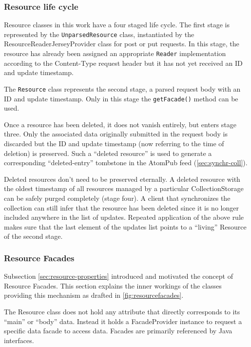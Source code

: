 \documentclass[11pt,a4paper,headsepline,twoside]{scrartcl}		%
\begin{document}
\subsubsection{Resource life cycle}
\label{sec:resource-life-cycle}


Resource classes in this work have a four staged life cycle. The first stage is
represented by the \lstinline:UnparsedResource: class, instantiated by the
ResourceReaderJerseyProvider class for post or put requests. In this stage, the
resource has already been assigned an appropriate \lstinline:Reader:
implementation according to the Content-Type request header but it has not yet
received an ID and update timestamp.

The \lstinline:Resource: class represents the second stage, a parsed request
body with an ID and update timestamp. Only in this stage the
\lstinline:getFacade(): method can be used.

Once a resource has been deleted, it does not vanish entirely, but enters stage
three. Only the associated data originally submitted in the request body is
discarded but the ID and update timestamp (now referring to the time of
deletion) is preserved. Such a ``deleted resource'' is used to generate a
corresponding ``deleted-entry'' tombstone in the AtomPub feed
(\autoref{sec:synchr-coll}).

Deleted resources don't need to be preserved eternally. A deleted resource with
the oldest timestamp of all resources managed by a particular CollectionStorage
can be safely purged completely (stage four). A client that synchronizes the
collection can still infer that the resource has been deleted since it is no
longer included anywhere in the list of updates. Repeated application of the
above rule makes sure that the last element of the updates list points to a
``living'' Resource of the second stage.

\subsubsection{Resource Facades}
\label{sec:resourcefacades}

Subsection \ref{sec:resource-properties} introduced and motivated the concept of
Resource Facades. This section explains the inner workings of the classes
providing this mechanism as drafted in \autoref{fig:resourcefacades}.

The Resource class does not hold any attribute that directly corresponds to its
``main'' or ``body'' data. Instead it holds a FacadeProvider instance to request
a specific data facade to access data. Facades are primarily referenced by Java
interfaces.
\end{document}
